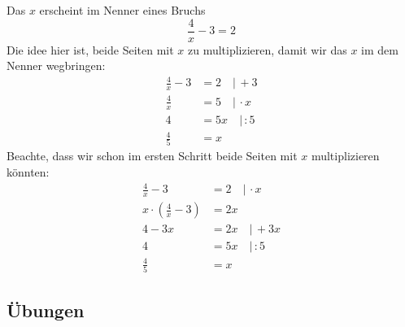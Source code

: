 \documentclass[%
11pt,%
twoside,%
titlepage,%
german,%
headsepline%
]{scrartcl}
\begin{document}
\begin{bsp} Das $x$ erscheint im Nenner eines Bruchs $$\frac{4}{x}-3 = 2$$ Die idee hier ist, beide Seiten mit $x$ zu multiplizieren, damit wir das $x$ im dem Nenner wegbringen: 
                \begin{align*}
                \frac{4}{x}-3 &= 2  \quad| \, +3\\
                \frac{4}{x} & = 5 \quad| \, \cdot x\\
                4 & =  5x\quad| \, :5\\
                {\frac{4}{5}}& = x  
                \end{align*}
                Beachte, dass wir schon im ersten Schritt beide Seiten mit $x$ multiplizieren könnten:
                \begin{align*}
                \frac{4}{x}-3 &= 2  \quad| \, \cdot x\\
                x\cdot (\frac{4}{x}-3) & = 2x \\
                4-3x & = 2x \quad| \, +3x\\
                4 & =  5x\quad| \, :5\\
                {\frac{4}{5}}& = x  
                \end{align*}
\end{bsp}

\subsection{Übungen}
\end{document}
